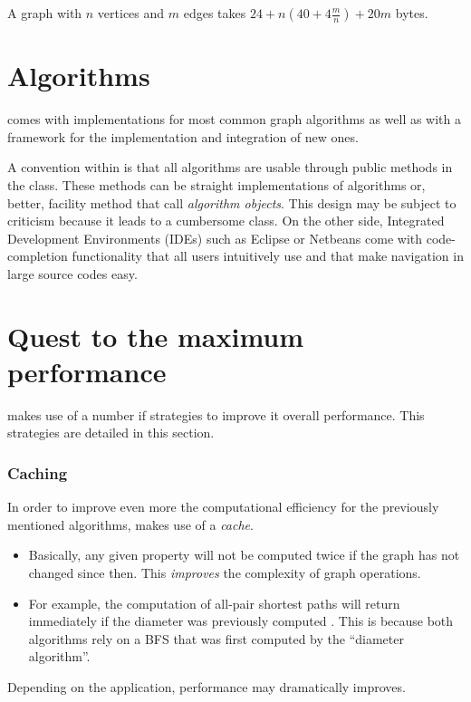 \documentclass{article}
\begin{document}
A graph with $n$ vertices and $m$ edges takes $24 + n(40+4\frac{m}{n}) + 20m$ bytes.


\section{Algorithms}

\grph comes with implementations for most common graph algorithms as well as with a framework for the implementation and integration
of new ones.

A convention within \grph is that all algorithms are usable through public
methods in the  class. These methods can be straight implementations of algorithms or, better, facility method that
call {\em algorithm objects}.
This design may be subject to criticism because it leads to a cumbersome  class. On the other side, Integrated Development
Environments (IDEs) such as Eclipse or Netbeans come with code-completion
functionality that all users intuitively use and that make navigation in large source codes easy.









\section{Quest to the maximum performance}

\grph makes use of a number if strategies to improve it overall performance. This strategies are detailed in this section. 

\subsubsection{Caching}

In order to improve even more the computational efficiency for the previously mentioned algorithms,
\grph makes use of a {\em cache}.
	  \begin{itemize}

\item Basically, any given property will not be computed twice if the graph has not changed since then.
This {\em improves} the complexity of graph operations.
\item For example, the computation of all-pair shortest paths will return immediately if 
the diameter  was previously computed . This is because both algorithms rely on a
BFS that was first computed by the ``diameter algorithm''.	
	  \end{itemize}
	  Depending on the application, performance  may dramatically improves.
\end{document}
